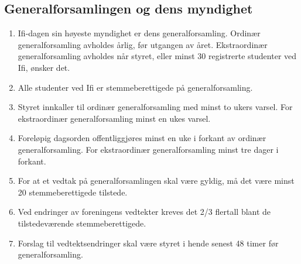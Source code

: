 \documentclass[norsk,a4paper]{article}
\providecommand{\DIFaddbegin}{} %
\providecommand{\DIFaddend}{} %
\providecommand{\DIFdelbegin}{} %
\providecommand{\DIFdelend}{} %
\newcommand{\DIFscaledelfig}{0.5}
\newlength{\DIFdelgraphicswidth} %
\newlength{\DIFdelgraphicsheight} %
\newcommand{\DIFaddincludegraphics}[2][]{{\color{blue}\fbox{\DIFOincludegraphics[#1]{#2}}}} %
\newcommand{\DIFdelincludegraphics}[2][]{%
\sbox{\DIFdelgraphicsbox}{\DIFOincludegraphics[#1]{#2}}%
\settoboxwidth{\DIFdelgraphicswidth}{\DIFdelgraphicsbox} %
\settoboxtotalheight{\DIFdelgraphicsheight}{\DIFdelgraphicsbox} %
\scalebox{\DIFscaledelfig}{%
\parbox[b]{\DIFdelgraphicswidth}{\usebox{\DIFdelgraphicsbox}\\[-\baselineskip] \rule{\DIFdelgraphicswidth}{0em}}\llap{\resizebox{\DIFdelgraphicswidth}{\DIFdelgraphicsheight}{%
\setlength{\unitlength}{\DIFdelgraphicswidth}%
\begin{picture}(1,1)%
\thicklines\linethickness{2pt} %
{\color[rgb]{1,0,0}\put(0,0){\framebox(1,1){}}}%
{\color[rgb]{1,0,0}\put(0,0){\line( 1,1){1}}}%
{\color[rgb]{1,0,0}\put(0,1){\line(1,-1){1}}}%
\end{picture}%
}\hspace*{3pt}}} %
} %
\DeclareRobustCommand{\DIFaddbegin}{\DIFOaddbegin \let\includegraphics\DIFaddincludegraphics} %
\DeclareRobustCommand{\DIFaddend}{\DIFOaddend \let\includegraphics\DIFOincludegraphics} %
\DeclareRobustCommand{\DIFdelbegin}{\DIFOdelbegin \let\includegraphics\DIFdelincludegraphics} %
\DeclareRobustCommand{\DIFdelend}{\DIFOaddend \let\includegraphics\DIFOincludegraphics} %
\begin{document}
\subsection{Generalforsamlingen og dens myndighet}
\begin{enumerate}
	\DIFdelbegin %
\DIFdelend \DIFaddbegin \item{Ifi-dagen sin høyeste myndighet er dens generalforsamling. Ordinær generalforsamling avholdes årlig, før utgangen av året. Ekstraordinær generalforsamling avholdes når styret, eller minst 30 registrerte studenter ved Ifi, ønsker det.}
	\DIFaddend \item{Alle studenter ved Ifi er stemmeberettigede på generalforsamling.}
	\item{Styret innkaller til ordinær generalforsamling med minst to ukers varsel. For ekstraordinær generalforsamling minst en ukes varsel.}
	\item{Foreløpig dagsorden offentliggjøres minst en uke i forkant av ordinær generalforsamling. For ekstraordinær generalforsamling minst tre dager i forkant.}
	\item{For at et vedtak på generalforsamlingen skal være gyldig, må det være minst 20 stemmeberettigede tilstede.}
	\item{Ved endringer av foreningens vedtekter kreves det 2/3 flertall blant de tilstedeværende stemmeberettigede.}
	\item{Forslag til vedtektsendringer skal være styret i hende senest 48 timer før generalforsamling.}
\end{enumerate}
\DIFaddbegin 
\end{document}
